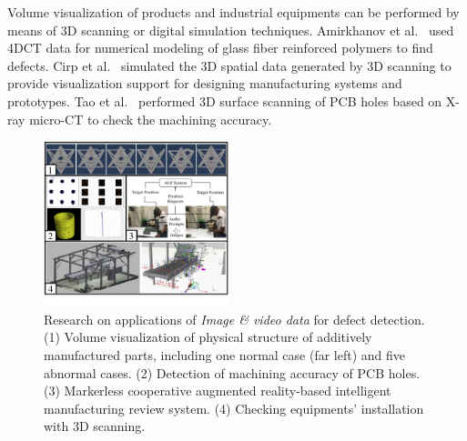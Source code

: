 \documentclass[a4paper,fleqn]{cas-dc}
\begin{document}
Volume visualization of products and industrial equipments can be performed by means of 3D scanning or digital simulation techniques.
Amirkhanov et al.~\cite{amirkhanov2016visual} used 4DCT data for numerical modeling of glass fiber reinforced polymers to find defects.
Cirp et al.~\cite{Cirp2019} simulated the 3D spatial data generated by 3D scanning to provide visualization support for designing manufacturing systems and prototypes.
Tao et al.~\cite{tao2020machining} performed 3D surface scanning of PCB holes based on X-ray micro-CT to check the machining accuracy.

\begin{figure}[pos=!h]
	\centering
	\includegraphics[width=0.48\textwidth]{Images/imageandvideo.pdf}
	\vspace{-2em}
	\caption{Research on applications of \textit{Image \& video data} for defect detection.(1) Volume visualization of physical structure of additively manufactured parts, including one normal case (far left) and five abnormal cases. (2) Detection of machining accuracy of PCB holes. (3) Markerless cooperative augmented reality-based intelligent manufacturing review system. (4) Checking equipments' installation with 3D scanning.}
	\label{fig:imageandvideo}
	\vspace{-1.5em}
\end{figure}

\end{document}
